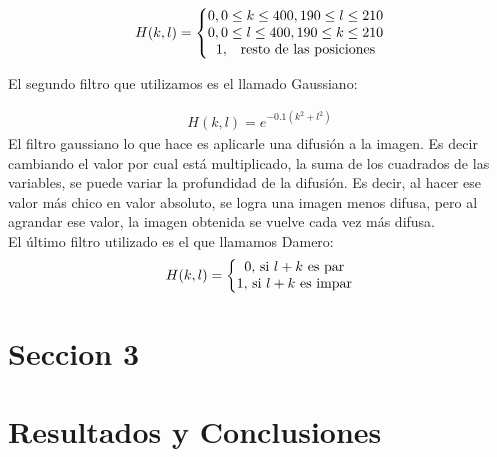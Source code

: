 \documentclass[11pt,a4paper]{emulateapj}
\begin{document}
\begin{eqnarray}
H(k,l) = \left\{
	\begin{matrix}
		0, 0 \leq k \leq 400, 190 \leq l \leq 210 \\
		0, 0 \leq l \leq 400, 190 \leq k \leq 210 \\
		1, \quad $resto de las posiciones$
	\end{matrix} 
	\right.
\end{eqnarray}

El segundo filtro que utilizamos es el llamado Gaussiano:

\begin{eqnarray}
H(k,l) = e^{-0.1(k^2 + l^2)}
\end{eqnarray}
El filtro gaussiano lo que hace es aplicarle una difusión a la imagen. Es decir cambiando el valor por cual está multiplicado, la suma de los cuadrados de las variables, se puede variar la profundidad de la difusión. Es decir, al hacer ese valor más chico en valor absoluto, se logra una imagen menos difusa, pero al agrandar ese valor, la imagen obtenida se vuelve cada vez más difusa.
\\
El último filtro utilizado es el que llamamos Damero:
\begin{eqnarray}
H(k,l) = \left\{
	\begin{matrix}
		0,$ si $l+k$ es par$\\
		1,$ si $l+k$ es impar$\\
	\end{matrix} 
	\right.
\end{eqnarray}


\section{Seccion 3}
\label{sec:sec3}




\section{Resultados y Conclusiones}
\label{sec:resultadosyconclusiones}

%

\end{document}
